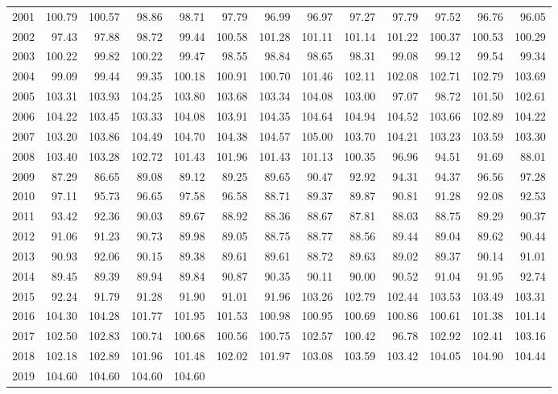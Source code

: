 \begin{longtable}{rrrrrrrrrrrrr}
  2001 & 100.79 & 100.57 & 98.86 & 98.71 & 97.79 & 96.99 & 96.97 & 97.27 & 97.79 & 97.52 & 96.76 & 96.05 \\ 
  2002 & 97.43 & 97.88 & 98.72 & 99.44 & 100.58 & 101.28 & 101.11 & 101.14 & 101.22 & 100.37 & 100.53 & 100.29 \\ 
  2003 & 100.22 & 99.82 & 100.22 & 99.47 & 98.55 & 98.84 & 98.65 & 98.31 & 99.08 & 99.12 & 99.54 & 99.34 \\ 
  2004 & 99.09 & 99.44 & 99.35 & 100.18 & 100.91 & 100.70 & 101.46 & 102.11 & 102.08 & 102.71 & 102.79 & 103.69 \\ 
  2005 & 103.31 & 103.93 & 104.25 & 103.80 & 103.68 & 103.34 & 104.08 & 103.00 & 97.07 & 98.72 & 101.50 & 102.61 \\ 
  2006 & 104.22 & 103.45 & 103.33 & 104.08 & 103.91 & 104.35 & 104.64 & 104.94 & 104.52 & 103.66 & 102.89 & 104.22 \\ 
  2007 & 103.20 & 103.86 & 104.49 & 104.70 & 104.38 & 104.57 & 105.00 & 103.70 & 104.21 & 103.23 & 103.59 & 103.30 \\ 
  2008 & 103.40 & 103.28 & 102.72 & 101.43 & 101.96 & 101.43 & 101.13 & 100.35 & 96.96 & 94.51 & 91.69 & 88.01 \\ 
  2009 & 87.29 & 86.65 & 89.08 & 89.12 & 89.25 & 89.65 & 90.47 & 92.92 & 94.31 & 94.37 & 96.56 & 97.28 \\ 
  2010 & 97.11 & 95.73 & 96.65 & 97.58 & 96.58 & 88.71 & 89.37 & 89.87 & 90.81 & 91.28 & 92.08 & 92.53 \\ 
  2011 & 93.42 & 92.36 & 90.03 & 89.67 & 88.92 & 88.36 & 88.67 & 87.81 & 88.03 & 88.75 & 89.29 & 90.37 \\ 
  2012 & 91.06 & 91.23 & 90.73 & 89.98 & 89.05 & 88.75 & 88.77 & 88.56 & 89.44 & 89.04 & 89.62 & 90.44 \\ 
  2013 & 90.93 & 92.06 & 90.15 & 89.38 & 89.61 & 89.61 & 88.72 & 89.63 & 89.02 & 89.37 & 90.14 & 91.01 \\ 
  2014 & 89.45 & 89.39 & 89.94 & 89.84 & 90.87 & 90.35 & 90.11 & 90.00 & 90.52 & 91.04 & 91.95 & 92.74 \\ 
  2015 & 92.24 & 91.79 & 91.28 & 91.90 & 91.01 & 91.96 & 103.26 & 102.79 & 102.44 & 103.53 & 103.49 & 103.31 \\ 
  2016 & 104.30 & 104.28 & 101.77 & 101.95 & 101.53 & 100.98 & 100.95 & 100.69 & 100.86 & 100.61 & 101.38 & 101.14 \\ 
  2017 & 102.50 & 102.83 & 100.74 & 100.68 & 100.56 & 100.75 & 102.57 & 100.42 & 96.78 & 102.92 & 102.41 & 103.16 \\ 
  2018 & 102.18 & 102.89 & 101.96 & 101.48 & 102.02 & 101.97 & 103.08 & 103.59 & 103.42 & 104.05 & 104.90 & 104.44 \\ 
  2019 & 104.60 & 104.60 & 104.60 & 104.60 &  &  &  &  &  &  &  &  \\ 
   \hline
\hline
\end{longtable}
